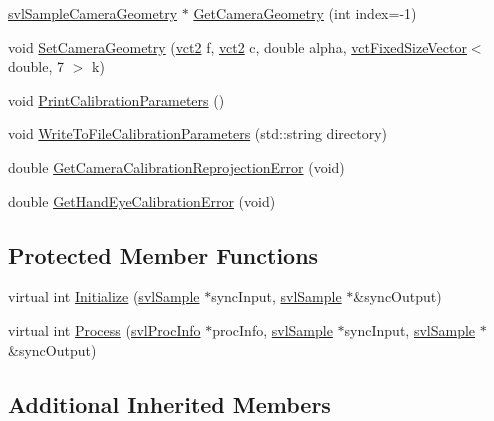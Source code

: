 \begin{DoxyCompactItemize}
\hyperlink{classsvl_sample_camera_geometry}{svl\-Sample\-Camera\-Geometry} $\ast$ \hyperlink{classsvl_filter_image_camera_calibration_open_c_v_a4c4b476c5c28daec797bd78759fc7f9b}{Get\-Camera\-Geometry} (int index=-\/1)
\item 
void \hyperlink{classsvl_filter_image_camera_calibration_open_c_v_a4d87d92e044f8a35b52b5eee82f9d7f8}{Set\-Camera\-Geometry} (\hyperlink{vct_fixed_size_vector_types_8h_a88481ac3c794867ba5e4e92624f0d958}{vct2} f, \hyperlink{vct_fixed_size_vector_types_8h_a88481ac3c794867ba5e4e92624f0d958}{vct2} c, double alpha, \hyperlink{classvct_fixed_size_vector}{vct\-Fixed\-Size\-Vector}$<$ double, 7 $>$ k)
\item 
void \hyperlink{classsvl_filter_image_camera_calibration_open_c_v_a5a2229d318fead587ba2b10b863cb446}{Print\-Calibration\-Parameters} ()
\item 
void \hyperlink{classsvl_filter_image_camera_calibration_open_c_v_ab1021bb36cc7f4ec92aef1899cfaa0a5}{Write\-To\-File\-Calibration\-Parameters} (std\-::string directory)
\item 
double \hyperlink{classsvl_filter_image_camera_calibration_open_c_v_aa62a80f133b42334a6b00c707efd3936}{Get\-Camera\-Calibration\-Reprojection\-Error} (void)
\item 
double \hyperlink{classsvl_filter_image_camera_calibration_open_c_v_a5cc9b1de3d14ba9e496e7d534c9b8ae7}{Get\-Hand\-Eye\-Calibration\-Error} (void)
\end{DoxyCompactItemize}
\subsection*{Protected Member Functions}
\begin{DoxyCompactItemize}
\item 
virtual int \hyperlink{classsvl_filter_image_camera_calibration_open_c_v_a29c2a251abd92cd6fe11202be06425e2}{Initialize} (\hyperlink{classsvl_sample}{svl\-Sample} $\ast$sync\-Input, \hyperlink{classsvl_sample}{svl\-Sample} $\ast$\&sync\-Output)
\item 
virtual int \hyperlink{classsvl_filter_image_camera_calibration_open_c_v_aa2154ceaf88e6888d205a5a5cac3f8ce}{Process} (\hyperlink{structsvl_proc_info}{svl\-Proc\-Info} $\ast$proc\-Info, \hyperlink{classsvl_sample}{svl\-Sample} $\ast$sync\-Input, \hyperlink{classsvl_sample}{svl\-Sample} $\ast$\&sync\-Output)
\end{DoxyCompactItemize}
\subsection*{Additional Inherited Members}


